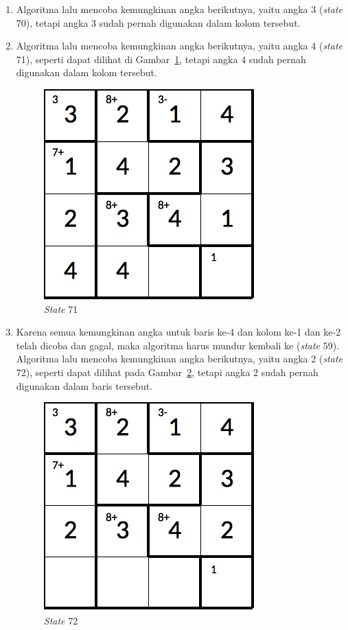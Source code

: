 \begin{enumerate}
\item Algoritma lalu mencoba kemungkinan angka berikutnya, yaitu angka 3 (\textit{state} 70), tetapi angka 3 sudah pernah digunakan dalam kolom tersebut.
\item Algoritma lalu mencoba kemungkinan angka berikutnya, yaitu angka 4 (\textit{state} 71), seperti dapat dilihat di Gambar~\ref{fig:analisisbt20}, tetapi angka 4 sudah pernah digunakan dalam kolom tersebut.

\begin{figure}
\centering
\captionsetup{justification=centering}
\includegraphics[scale=0.333]{Gambar/backtracking/State71}
\caption[\textit{State} 71]{\textit{State} 71}
\label{fig:analisisbt20}
\end{figure}

\item Karena semua kemungkinan angka untuk baris ke-4 dan kolom ke-1 dan ke-2 telah dicoba dan gagal, maka algoritma harus mundur kembali ke (\textit{state} 59). Algoritma lalu mencoba kemungkinan angka berikutnya, yaitu angka 2 (\textit{state} 72), seperti dapat dilihat pada Gambar~\ref{fig:analisisbt21}, tetapi angka 2 sudah pernah digunakan dalam baris tersebut.

\begin{figure}
\centering
\captionsetup{justification=centering}
\includegraphics[scale=0.333]{Gambar/backtracking/State72}
\caption[\textit{State} 72]{\textit{State} 72}
\label{fig:analisisbt21}
\end{figure}


\end{enumerate}
